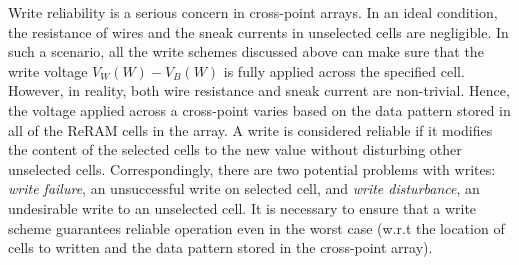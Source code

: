 Write reliability is a serious concern in cross-point arrays. In an ideal
condition, the resistance of wires and the sneak currents in unselected
cells are negligible. In such a scenario, all the write schemes discussed
above can make sure that the write voltage $V_W(W)-V_B(W)$ is fully
applied across the specified cell. However, in reality, both wire
resistance and sneak current are non-trivial. Hence, the voltage applied
across a cross-point varies based on the data pattern stored in all of the
ReRAM cells in the array. A write is considered reliable if it modifies
the content of the selected cells to the new value without disturbing
other unselected cells.
Correspondingly, there are two potential problems with writes: \emph{write
failure}, an unsuccessful write on selected cell, and \emph{write
disturbance}, an undesirable write to an unselected cell. It is necessary to ensure that a write scheme guarantees reliable operation even in the worst case (w.r.t the location of cells to written and the data pattern stored in the cross-point array).

